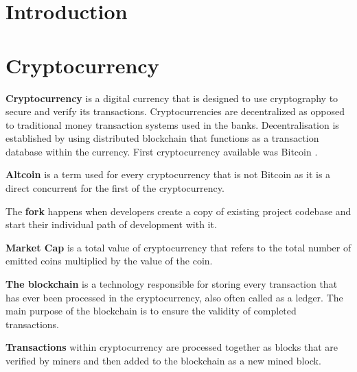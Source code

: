 \documentclass[
  printed, %
  table,   %
  nolof,     %
  nolot,     %
           oneside, color
]{fithesis3}
\begin{document}
\chapter{Introduction}

\chapter{Cryptocurrency}
\textbf{Cryptocurrency} is a digital currency that is designed to use cryptography to secure and verify its transactions. Cryptocurrencies are decentralized as opposed to traditional money transaction systems used in the banks. Decentralisation is established by using distributed blockchain that functions as a transaction database within the currency. First cryptocurrency available was Bitcoin \cite{farell2015analysis}.

\textbf{Altcoin} is a term used for every cryptocurrency that is not Bitcoin as it is a direct concurrent for the first of the cryptocurrency.

The \textbf{fork} happens when developers create a copy of existing project codebase and start their individual path of development with it. 

\textbf{Market Cap} is a total value of cryptocurrency that refers to the total number of emitted coins multiplied by the value of the coin.

\textbf{The blockchain} is a technology responsible for storing every transaction that has ever been processed in the cryptocurrency, also often called as a ledger. The main purpose of the blockchain is to ensure the validity of completed transactions.

\textbf{Transactions} within cryptocurrency are processed together as blocks that are verified by miners and then added to the blockchain as a new mined block.
\end{document}
